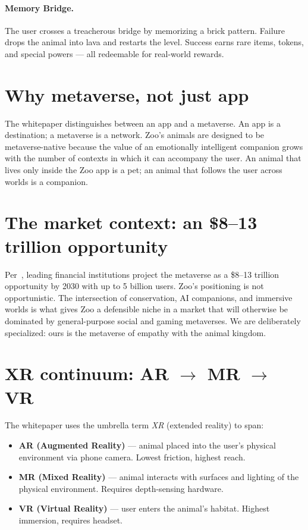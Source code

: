 \documentclass[11pt,letterpaper]{article}
\begin{document}
\paragraph{Memory Bridge.} The user crosses a treacherous bridge by memorizing a brick pattern. Failure drops the animal into lava and restarts the level. Success earns rare items, tokens, and special powers --- all redeemable for real-world rewards.

\section{Why metaverse, not just app}

The whitepaper distinguishes between an app and a metaverse. An app is a destination; a metaverse is a network. Zoo's animals are designed to be metaverse-native because the value of an emotionally intelligent companion grows with the number of contexts in which it can accompany the user. An animal that lives only inside the Zoo app is a pet; an animal that follows the user across worlds is a companion.

\section{The market context: an \$8--13 trillion opportunity}

Per~\cite{zoo2021}, leading financial institutions project the metaverse as a \$8--13 trillion opportunity by 2030 with up to 5 billion users. Zoo's positioning is not opportunistic. The intersection of conservation, AI companions, and immersive worlds is what gives Zoo a defensible niche in a market that will otherwise be dominated by general-purpose social and gaming metaverses. We are deliberately specialized: ours is the metaverse of empathy with the animal kingdom.

\section{XR continuum: AR \texorpdfstring{$\to$}{->} MR \texorpdfstring{$\to$}{->} VR}

The whitepaper uses the umbrella term \emph{XR} (extended reality) to span:

\begin{itemize}
  \item \textbf{AR (Augmented Reality)} --- animal placed into the user's physical environment via phone camera. Lowest friction, highest reach.
  \item \textbf{MR (Mixed Reality)} --- animal interacts with surfaces and lighting of the physical environment. Requires depth-sensing hardware.
  \item \textbf{VR (Virtual Reality)} --- user enters the animal's habitat. Highest immersion, requires headset.
\end{itemize}
\end{document}
